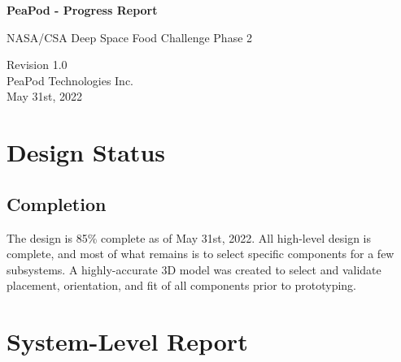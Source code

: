 \documentclass{../tex/report}
\begin{document}
\begin{titlepage}
    \begin{center}
        \vspace*{1.2cm}

        \textbf{\large{PeaPod - Progress Report}}

        \vspace{0.5cm}

        NASA/CSA Deep Space Food Challenge Phase 2

        \vfill
        
        \vspace{.75cm}

        Revision 1.0\\
        PeaPod Technologies Inc.\\
        May 31st, 2022

    \end{center}
\end{titlepage}

\thispagestyle{plain}

\tableofcontents
\clearpage

\section{Design Status}

\subsection{Completion}

The design is 85\% complete as of May 31st, 2022. All high-level design is complete, and most of what remains is to select specific components for a few subsystems. A highly-accurate 3D model was created to select and validate placement, orientation, and fit of all components prior to prototyping.



\clearpage

\section{System-Level Report}



\clearpage


\end{document}
